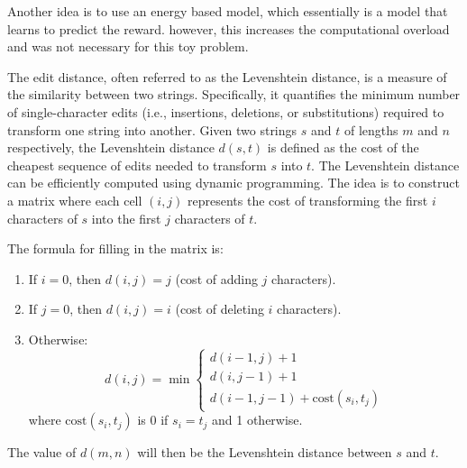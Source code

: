 Another idea is to use an energy based model, which essentially is a model that learns to predict the reward. however, this increases the computational overload and was not necessary for this toy problem.

The edit distance, often referred to as the Levenshtein distance, is a measure of the similarity between two strings. Specifically, it quantifies the minimum number of single-character edits (i.e., insertions, deletions, or substitutions) required to transform one string into another.
Given two strings \( s \) and \( t \) of lengths \( m \) and \( n \) respectively, the Levenshtein distance \( d(s, t) \) is defined as the cost of the cheapest sequence of edits needed to transform \( s \) into \( t \). 
The Levenshtein distance can be efficiently computed using dynamic programming. The idea is to construct a matrix where each cell \( (i, j) \) represents the cost of transforming the first \( i \) characters of \( s \) into the first \( j \) characters of \( t \). 

The formula for filling in the matrix is:
\begin{enumerate}
    \item If \( i = 0 \), then \( d(i, j) = j \) (cost of adding \( j \) characters).
    \item If \( j = 0 \), then \( d(i, j) = i \) (cost of deleting \( i \) characters).
    \item Otherwise:   \[
        d(i, j) = \min \begin{cases} 
        d(i-1, j) + 1 \\ 
        d(i, j-1) + 1 \\ 
        d(i-1, j-1) + \text{cost}(s_i, t_j) 
        \end{cases}
        \]
        where \( \text{cost}(s_i, t_j) \) is 0 if \( s_i = t_j \) and 1 otherwise.
\end{enumerate}

The value of \( d(m, n) \) will then be the Levenshtein distance between \( s \) and \( t \).


